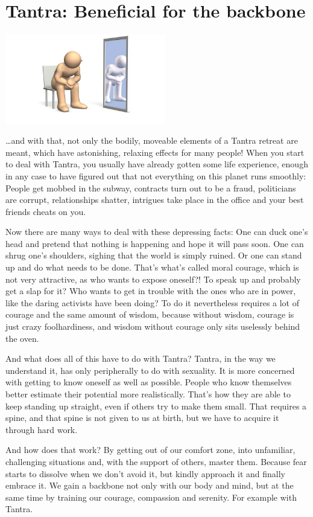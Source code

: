 \section{Tantra: Beneficial for the backbone}

\begin{center}
\includegraphics[width=7cm]{images/08_backbone.jpg}
\end{center}

\ldots and with that, not only the bodily, moveable elements of a Tantra retreat are meant, which have astonishing, relaxing effects for many people! When you start to deal with Tantra, you usually have already gotten some life experience, enough in any case to have figured out that not everything on this planet runs smoothly: People get mobbed in the subway, contracts turn out to be a fraud, politicians are corrupt, relationships shatter, intrigues take place in the office and your best friends cheats on you.

Now there are many ways to deal with these depressing facts: One can duck one's head and pretend that nothing is happening and hope it will pass soon. One can shrug one's shoulders, sighing that the world is simply ruined. Or one can stand up and do what needs to be done. That's what's called moral courage, which is not very attractive, as who wants to expose oneself?! To speak up and probably get a slap for it? Who wants to get in trouble with the ones who are in power, like the daring activists have been doing? To do it nevertheless requires a lot of courage and the same amount of wisdom, because without wisdom, courage is just crazy foolhardiness, and wisdom without courage only sits uselessly behind the oven.

And what does all of this have to do with Tantra? Tantra, in the way we understand it, has only peripherally to do with sexuality. It is more concerned with getting to know oneself as well as possible. People who know themselves better estimate their potential more realistically. That's how they are able to keep standing up straight, even if others try to make them small. That requires a spine, and that spine is not given to us at birth, but we have to acquire it through hard work.

And how does that work? By getting out of our comfort zone, into unfamiliar, challenging situations and, with the support of others, master them. Because fear starts to dissolve when we don't avoid it, but kindly approach it and finally embrace it. We gain a backbone not only with our body and mind, but at the same time by training our courage, compassion and serenity. For example with Tantra.
